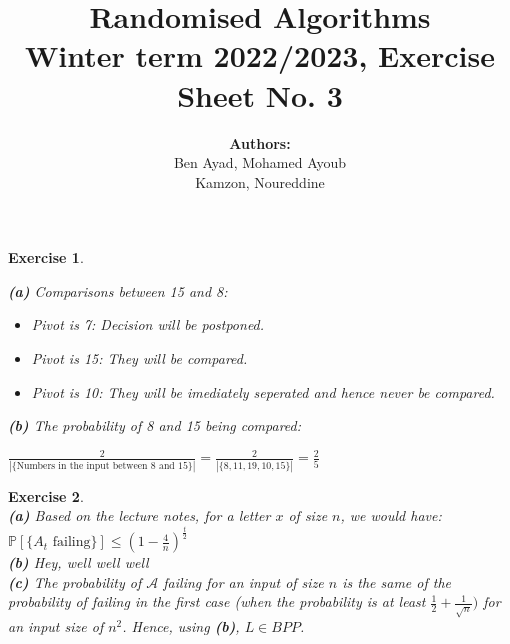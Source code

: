 \documentclass{article}
\title{Randomised Algorithms \\
Winter term 2022/2023, Exercise Sheet No. 3}
\author{
    \textbf{Authors:} \\
    Ben Ayad, Mohamed Ayoub \\
    Kamzon, Noureddine
}
\newtheorem{exo}{Exercise}
\def\P{\mathbb{P}}
\begin{document}
\maketitle


\begin{exo}{\ \\}

\noindent
\textbf{(a)} Comparisons between 15 and 8:
\begin{itemize}
    \item Pivot is 7: Decision will be postponed.
    \item Pivot is 15: They will be compared.
    \item Pivot is 10: They will be imediately seperated and hence never be compared.
\end{itemize}
   
\noindent
\textbf{(b)} The probability of 8 and 15 being compared:

$\frac{2}{|\{\text{Numbers in the input between $8$ and $15$}\}|} = \frac{2}{|\{8,11,19,10,15\}|} = \frac{2}{5}  $


\end{exo}


\begin{exo}{\ \\}
\noindent
\textbf{(a)}
Based on the lecture notes, for a letter $x$ of size $n$, we would have: $ \P[\{ \text{{$A_t$ failing}} \}] \leq (1-\frac{4}{n})^{\frac{t}{2}} $ \\


\noindent
\textbf{(b)}  Hey, well well well \\

\noindent
\textbf{(c)}
The probability of $\mathcal{A}$ failing for an input of size $n$ is the same of the probability of failing in the first case (when the probability is at least $\frac{1}{2}+\frac{1}{\sqrt{n}})$ for an input size of $n^2$. Hence, using \textbf{(b)}, $L \in BPP$.

\end{exo}
\end{document}

